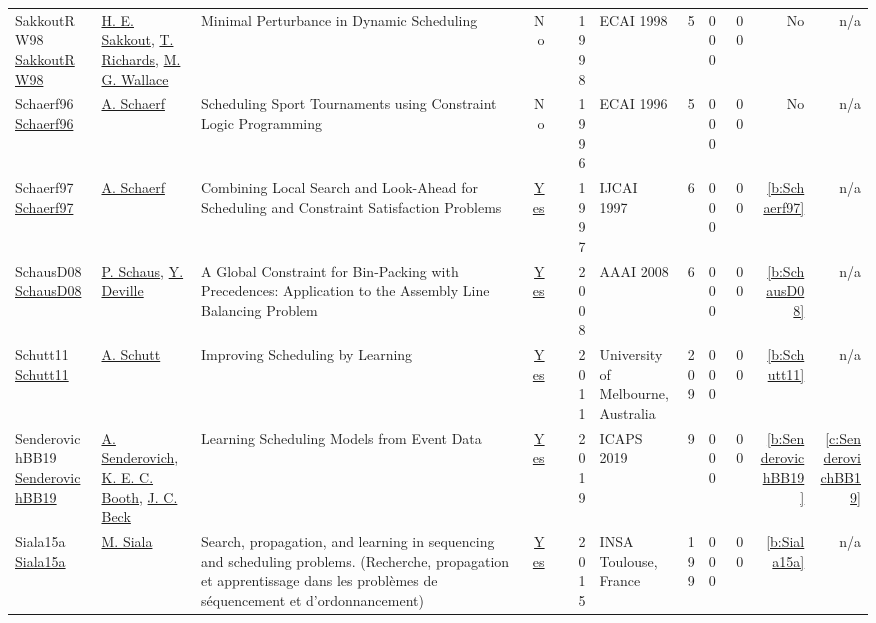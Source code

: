 {\begin{longtable}{>{\raggedright\arraybackslash}p{3cm}>{\raggedright\arraybackslash}p{4.5cm}>{\raggedright\arraybackslash}p{6.0cm}rrrp{2.5cm}rp{1cm}p{1cm}rr}
SakkoutRW98 \href{}{SakkoutRW98} & \hyperref[auth:a166]{H. E. Sakkout}, \hyperref[auth:a1266]{T. Richards}, \hyperref[auth:a117]{M. G. Wallace} & Minimal Perturbance in Dynamic Scheduling & No & \cite{SakkoutRW98} & 1998 & ECAI 1998 & 5 & 0 0 0 & 0 0 & No & n/a\\
Schaerf96 \href{}{Schaerf96} & \hyperref[auth:a1262]{A. Schaerf} & Scheduling Sport Tournaments using Constraint Logic Programming & No & \cite{Schaerf96} & 1996 & ECAI 1996 & 5 & 0 0 0 & 0 0 & No & n/a\\
Schaerf97 \href{http://ijcai.org/Proceedings/97-2/Papers/067.pdf}{Schaerf97} & \hyperref[auth:a1262]{A. Schaerf} & Combining Local Search and Look-Ahead for Scheduling and Constraint Satisfaction Problems & \href{../works/Schaerf97.pdf}{Yes} & \cite{Schaerf97} & 1997 & IJCAI 1997 & 6 & 0 0 0 & 0 0 & \ref{b:Schaerf97} & n/a\\
SchausD08 \href{http://www.aaai.org/Library/AAAI/2008/aaai08-058.php}{SchausD08} & \hyperref[auth:a147]{P. Schaus}, \hyperref[auth:a151]{Y. Deville} & A Global Constraint for Bin-Packing with Precedences: Application to the Assembly Line Balancing Problem & \href{../works/SchausD08.pdf}{Yes} & \cite{SchausD08} & 2008 & AAAI 2008 & 6 & 0 0 0 & 0 0 & \ref{b:SchausD08} & n/a\\
Schutt11 \href{https://www.a4cp.org/sites/default/files/andreas_schutt_-_improving_scheduling_by_learning.pdf}{Schutt11} & \hyperref[auth:a124]{A. Schutt} & Improving Scheduling by Learning & \href{../works/Schutt11.pdf}{Yes} & \cite{Schutt11} & 2011 & University of Melbourne, Australia & 209 & 0 0 0 & 0 0 & \ref{b:Schutt11} & n/a\\
SenderovichBB19 \href{https://ojs.aaai.org/index.php/ICAPS/article/view/3504}{SenderovichBB19} & \hyperref[auth:a1372]{A. Senderovich}, \hyperref[auth:a203]{K. E. C. Booth}, \hyperref[auth:a89]{J. C. Beck} & Learning Scheduling Models from Event Data & \href{../works/SenderovichBB19.pdf}{Yes} & \cite{SenderovichBB19} & 2019 & ICAPS 2019 & 9 & 0 0 0 & 0 0 & \ref{b:SenderovichBB19} & \ref{c:SenderovichBB19}\\
Siala15a \href{https://tel.archives-ouvertes.fr/tel-01164291}{Siala15a} & \hyperref[auth:a129]{M. Siala} & Search, propagation, and learning in sequencing and scheduling problems. (Recherche, propagation et apprentissage dans les probl{\`{e}}mes de s{\'{e}}quencement et d'ordonnancement) & \href{../works/Siala15a.pdf}{Yes} & \cite{Siala15a} & 2015 & {INSA} Toulouse, France & 199 & 0 0 0 & 0 0 & \ref{b:Siala15a} & n/a\\

\end{longtable}}
